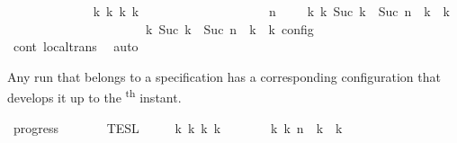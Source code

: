 \begin{isabellebody}
\ \ \ \ \ \ \ \ \ \ \ \ \isamarkupfalse%
\ {\isacartoucheopen}{\isasymexists}{\isasymGamma}\isactrlsub k\ {\isasymPsi}\isactrlsub k\ {\isasymPhi}\isactrlsub k\ k{\isachardot}\isanewline
\ \ \ \ \ \ \ \ \ \ \ \ \ \ \ \ \ \ \ {\isacharparenleft}{\isacharparenleft}{\isasymGamma}{\isacharcomma}\ n\ {\isasymturnstile}\ {\isasymPsi}\ {\isasymtriangleright}\ {\isasymPhi}{\isacharparenright}\ {\isasymhookrightarrow}\isactrlbsup k\isactrlesup \ {\isacharparenleft}{\isasymGamma}\isactrlsub k{\isacharcomma}\ Suc\ {\isacharparenleft}{\isasymdelta}k\ {\isacharplus}\ Suc\ n{\isacharparenright}\ {\isasymturnstile}\ {\isasymPsi}\isactrlsub k\ {\isasymtriangleright}\ {\isasymPhi}\isactrlsub k{\isacharparenright}{\isacharparenright}\isanewline
\ \ \ \ \ \ \ \ \ \ \ \ \ \ \ \ \ \ {\isasymand}\ {\isasymrho}\ {\isasymin}\ {\isasymlbrakk}\ {\isasymGamma}\isactrlsub k{\isacharcomma}\ Suc\ {\isasymdelta}k\ {\isacharplus}\ Suc\ n\ {\isasymturnstile}\ {\isasymPsi}\isactrlsub k\ {\isasymtriangleright}\ {\isasymPhi}\isactrlsub k\ {\isasymrbrakk}\isactrlsub c\isactrlsub o\isactrlsub n\isactrlsub f\isactrlsub i\isactrlsub g{\isacartoucheclose}\isanewline
\ \ \ \ \ \ \ \ \ \ \ \ \isamarkupfalse%
\ cont{}\ local{\isachardot}trans\ \isamarkupfalse%
\ auto\isanewline
\ \ \ \ \ \ \ \ \ \ \isamarkupfalse%
\isanewline
\ \ \ \ \isamarkupfalse%
\isanewline
{}\isamarkupfalse%
%
\endisatagproof
{\isafoldproof}%
%
\isadelimproof
%
\endisadelimproof
%
\begin{isamarkuptext}%
Any run that belongs to a specification \isa{{\isasymPsi}} has a corresponding 
  configuration that develops it up to the \textsuperscript{th} instant.%
\end{isamarkuptext}\isamarkuptrue%
\isamarkupfalse%
\ progress{\isacharcolon}\isanewline
\ \ \ {\isacartoucheopen}{\isasymrho}\ {\isasymin}\ {\isasymlbrakk}{\isasymlbrakk}\ {\isasymPsi}\ {\isasymrbrakk}{\isasymrbrakk}\isactrlsub T\isactrlsub E\isactrlsub S\isactrlsub L{\isacartoucheclose}\isanewline
\ \ \ \ \ {\isacartoucheopen}{\isasymexists}k\ {\isasymGamma}\isactrlsub k\ {\isasymPsi}\isactrlsub k\ {\isasymPhi}\isactrlsub k{\isachardot}\ {\isacharparenleft}{\isacharparenleft}{\isacharbrackleft}{\isacharbrackright}{\isacharcomma}\ {}\ {\isasymturnstile}\ {\isasymPsi}\ {\isasymtriangleright}\ {\isacharbrackleft}{\isacharbrackright}{\isacharparenright}\ \ {\isasymhookrightarrow}\isactrlbsup k\isactrlesup \ {\isacharparenleft}{\isasymGamma}\isactrlsub k{\isacharcomma}\ n\ {\isasymturnstile}\ {\isasymPsi}\isactrlsub k\ {\isasymtriangleright}\ {\isasymPhi}\isactrlsub k{\isacharparenright}{\isacharparenright}\isanewline

\end{isabellebody}
